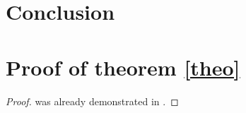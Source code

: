 \documentclass{thesisreport}
\begin{document}
 
 \chapter*{Conclusion}
 
 
 
 

 \appendix	
 
 \chapter{Proof of theorem \ref{theo}}
 \label{sec:prooftheorem}
  
 \begin{proof}
 was already demonstrated in \cite{Bouabdalla2007}.
\end{proof}

 \nocite{*}
 
 

 
 
\end{document}
